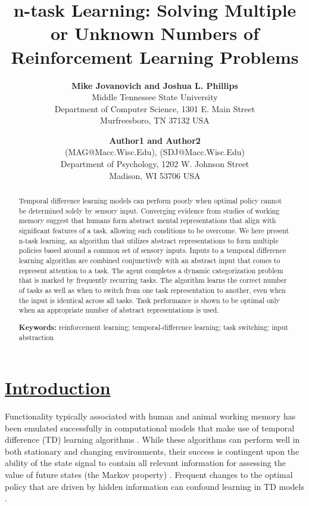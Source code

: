 \documentclass[10pt,letterpaper]{article}
\title{n-task Learning: Solving Multiple or Unknown Numbers of Reinforcement Learning Problems}
\author{{\large \bf Mike Jovanovich and Joshua L. Phillips} \\
  Middle Tennessee State University \\
  Department of Computer Science, 1301 E. Main Street \\
  Murfreesboro, TN 37132 USA}
\author{{\large \bf Author1 and Author2} \\ 
  (MAG@Macc.Wisc.Edu), (SDJ@Macc.Wisc.Edu) \\
  Department of Psychology, 1202 W. Johnson Street \\
  Madison, WI 53706 USA}
\begin{document}
\maketitle

\begin{abstract}
Temporal difference learning models can perform poorly when optimal policy cannot be determined solely by sensory input. Converging evidence from studies of working memory suggest that humans form abstract mental representations that align with significant features of a task, allowing such conditions to be overcome. We here present n-task learning, an algorithm that utilizes abstract representations to form multiple policies based around a common set of sensory inputs. Inputs to a temporal difference learning algorithm are combined conjunctively with an abstract input that comes to represent attention to a task. The agent completes a dynamic categorization problem that is marked by frequently recurring tasks. The algorithm learns the correct number of tasks as well as when to switch from one task representation to another, even when the input is identical across all tasks. Task performance is shown to be optimal only when an appropriate number of abstract representations is used.

\textbf{Keywords:} 
reinforcement learning; temporal-difference learning; task switching; input abstraction

\end{abstract}

\section{\underline{Introduction}}

Functionality typically associated with human and animal working memory has been emulated successfully in computational models that make use of temporal difference (TD) learning algorithms \cite{oreilly_prefrontal_2002,oreilly_making_2006,oreilly_biologically_2006,frank_interactions_2001,kriete_generalisation_2011,kriete_indirection_2013,niv_reinforcement_2015,rougier_prefrontal_2005,phillips_biologically_2005,phillips_working_2006}. While these algorithms can perform well in both stationary and changing environments, their success is contingent upon the ability of the state signal to contain all relevant information for assessing the value of future states (the Markov property) \cite{sutton_reinforcement_1998}. Frequent changes to the optimal policy that are driven by hidden information can confound learning in TD models \cite{sutton_between_1999}.
\end{document}
